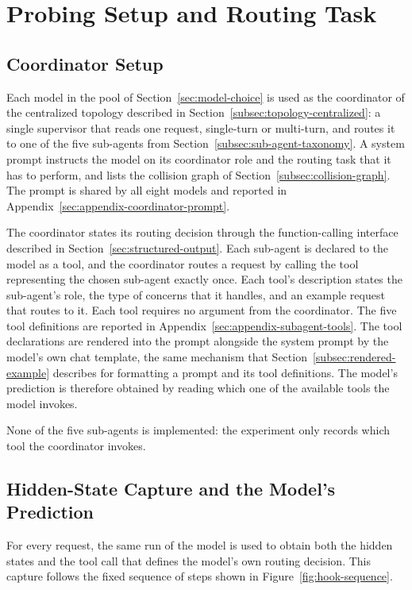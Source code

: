 \section{Probing Setup and Routing Task}
\label{sec:ch7-probing-setup}

\subsection{Coordinator Setup}
\label{subsec:ch7-coordinator-prompt}

Each model in the pool of Section~\ref{sec:model-choice} is used as the coordinator of the centralized topology described in Section~\ref{subsec:topology-centralized}: a single supervisor that reads one request, single-turn or multi-turn, and routes it to one of the five sub-agents from Section~\ref{subsec:sub-agent-taxonomy}. A system prompt instructs the model on its coordinator role and the routing task that it has to perform, and lists the collision graph of Section~\ref{subsec:collision-graph}. The prompt is shared by all eight models and reported in Appendix~\ref{sec:appendix-coordinator-prompt}.

The coordinator states its routing decision through the function-calling interface described in Section~\ref{sec:structured-output}. Each sub-agent is declared to the model as a tool, and the coordinator routes a request by calling the tool representing the chosen sub-agent exactly once. Each tool's description states the sub-agent's role, the type of concerns that it handles, and an example request that routes to it. Each tool requires no argument from the coordinator. The five tool definitions are reported in Appendix~\ref{sec:appendix-subagent-tools}. The tool declarations are rendered into the prompt alongside the system prompt by the model's own chat template, the same mechanism that Section~\ref{subsec:rendered-example} describes for formatting a prompt and its tool definitions. The model's prediction is therefore obtained by reading which one of the available tools the model invokes.

None of the five sub-agents is implemented: the experiment only records which tool the coordinator invokes.

\subsection{Hidden-State Capture and the Model's Prediction}
\label{subsec:ch7-hook}

For every request, the same run of the model is used to obtain both the hidden states and the tool call that defines the model's own routing decision. This capture follows the fixed sequence of steps shown in Figure~\ref{fig:hook-sequence}.

